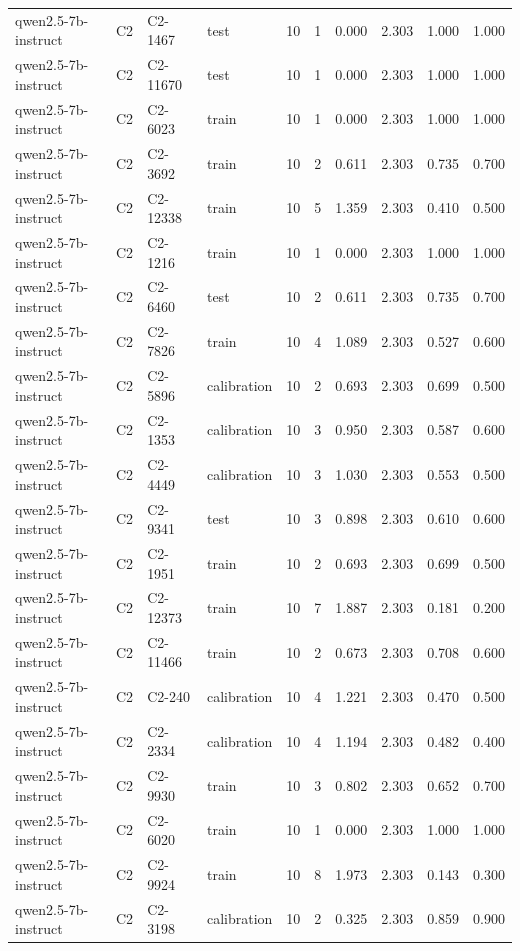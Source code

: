 \begin{table}
\begin{tabular}{llllrrrrrr}
qwen2.5-7b-instruct & C2 & C2-1467 & test & 10 & 1 & 0.000 & 2.303 & 1.000 & 1.000 \\
qwen2.5-7b-instruct & C2 & C2-11670 & test & 10 & 1 & 0.000 & 2.303 & 1.000 & 1.000 \\
qwen2.5-7b-instruct & C2 & C2-6023 & train & 10 & 1 & 0.000 & 2.303 & 1.000 & 1.000 \\
qwen2.5-7b-instruct & C2 & C2-3692 & train & 10 & 2 & 0.611 & 2.303 & 0.735 & 0.700 \\
qwen2.5-7b-instruct & C2 & C2-12338 & train & 10 & 5 & 1.359 & 2.303 & 0.410 & 0.500 \\
qwen2.5-7b-instruct & C2 & C2-1216 & train & 10 & 1 & 0.000 & 2.303 & 1.000 & 1.000 \\
qwen2.5-7b-instruct & C2 & C2-6460 & test & 10 & 2 & 0.611 & 2.303 & 0.735 & 0.700 \\
qwen2.5-7b-instruct & C2 & C2-7826 & train & 10 & 4 & 1.089 & 2.303 & 0.527 & 0.600 \\
qwen2.5-7b-instruct & C2 & C2-5896 & calibration & 10 & 2 & 0.693 & 2.303 & 0.699 & 0.500 \\
qwen2.5-7b-instruct & C2 & C2-1353 & calibration & 10 & 3 & 0.950 & 2.303 & 0.587 & 0.600 \\
qwen2.5-7b-instruct & C2 & C2-4449 & calibration & 10 & 3 & 1.030 & 2.303 & 0.553 & 0.500 \\
qwen2.5-7b-instruct & C2 & C2-9341 & test & 10 & 3 & 0.898 & 2.303 & 0.610 & 0.600 \\
qwen2.5-7b-instruct & C2 & C2-1951 & train & 10 & 2 & 0.693 & 2.303 & 0.699 & 0.500 \\
qwen2.5-7b-instruct & C2 & C2-12373 & train & 10 & 7 & 1.887 & 2.303 & 0.181 & 0.200 \\
qwen2.5-7b-instruct & C2 & C2-11466 & train & 10 & 2 & 0.673 & 2.303 & 0.708 & 0.600 \\
qwen2.5-7b-instruct & C2 & C2-240 & calibration & 10 & 4 & 1.221 & 2.303 & 0.470 & 0.500 \\
qwen2.5-7b-instruct & C2 & C2-2334 & calibration & 10 & 4 & 1.194 & 2.303 & 0.482 & 0.400 \\
qwen2.5-7b-instruct & C2 & C2-9930 & train & 10 & 3 & 0.802 & 2.303 & 0.652 & 0.700 \\
qwen2.5-7b-instruct & C2 & C2-6020 & train & 10 & 1 & 0.000 & 2.303 & 1.000 & 1.000 \\
qwen2.5-7b-instruct & C2 & C2-9924 & train & 10 & 8 & 1.973 & 2.303 & 0.143 & 0.300 \\
qwen2.5-7b-instruct & C2 & C2-3198 & calibration & 10 & 2 & 0.325 & 2.303 & 0.859 & 0.900 \\

\end{tabular}
\end{table}
